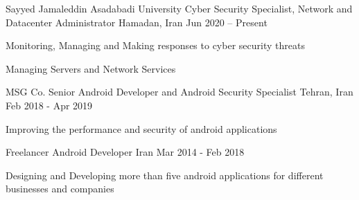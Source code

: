 

\begin{cventries}

        \cventry
        {Sayyed Jamaleddin Asadabadi University}
        {Cyber Security Specialist, Network and Datacenter Administrator}
        {Hamadan, Iran}
        {Jun 2020 – Present}
        {
            \begin{cvitems} 
                \item {Monitoring, Managing and Making responses to cyber security threats}
                \item {Managing Servers and Network Services}
            \end{cvitems}
        }

    \cventry
        {MSG Co.}
        {Senior Android Developer and Android Security Specialist}
        {Tehran, Iran}
        {Feb 2018 - Apr 2019}
        {
            \begin{cvitems} 
                \item {Improving the performance and security of android applications}
            \end{cvitems}
        }

    \cventry
        {Freelancer} 
        {Android Developer}
        {Iran} 
        {Mar 2014 - Feb 2018} 
        {
            \begin{cvitems} 
                \item {Designing and Developing more than five android applications for different businesses and companies}
            \end{cvitems}
        }

\end{cventries}